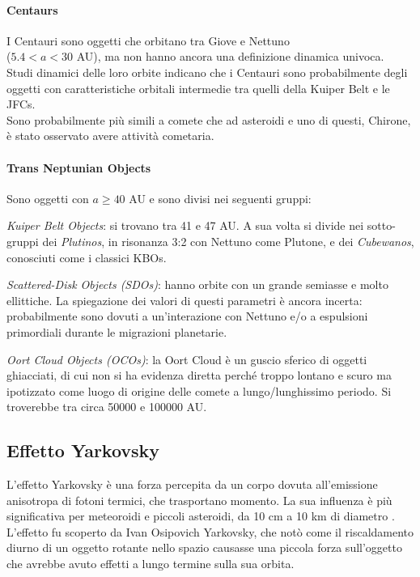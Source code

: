\documentclass[a4paper,11pt,openright]{book}
\begin{document}
\paragraph*{Centaurs}
I Centauri sono oggetti che orbitano tra Giove e Nettuno\\($5.4<a<30$ AU), ma non hanno ancora una definizione dinamica univoca.\\
Studi dinamici delle loro orbite indicano che i Centauri sono probabilmente degli oggetti con caratteristiche orbitali intermedie tra quelli della Kuiper Belt e le JFCs.\\
Sono probabilmente più simili a comete che ad asteroidi e uno di questi, Chirone, è stato osservato avere attività cometaria.

\paragraph*{Trans Neptunian Objects}
Sono oggetti con $a\geq 40$ AU e sono divisi nei seguenti gruppi:

\qquad \textit{Kuiper Belt Objects}: si trovano tra 41 e 47 AU. A sua volta si divide nei sotto-gruppi dei \textit{Plutinos}, in risonanza 3:2 con Nettuno come Plutone, e dei \textit{Cubewanos}, conosciuti come i classici KBOs.

\qquad \textit{Scattered-Disk Objects (SDOs)}: hanno orbite con un grande semiasse e molto ellittiche. La spiegazione dei valori di questi parametri è ancora incerta: probabilmente sono dovuti a un’interazione con Nettuno e/o a espulsioni primordiali durante le migrazioni planetarie.

\qquad \textit{Oort Cloud Objects (OCOs)}: la Oort Cloud è un guscio sferico di oggetti ghiacciati, di cui non si ha evidenza diretta perché troppo lontano e scuro ma ipotizzato come luogo di origine delle comete a lungo/lunghissimo periodo. Si troverebbe tra circa 50000 e 100000 AU.

\subsection{Effetto Yarkovsky}
L’effetto Yarkovsky è una forza percepita da un corpo dovuta all’emissione anisotropa di fotoni termici, che trasportano momento. La sua influenza è più significativa per meteoroidi e piccoli asteroidi, da 10 cm a 10 km di diametro \citep{vokrouhlicky_yarkovsky_2015}.\\
L’effetto fu scoperto da Ivan Osipovich Yarkovsky, che notò come il riscaldamento diurno di un oggetto rotante nello spazio causasse una piccola forza sull’oggetto che avrebbe avuto effetti a lungo termine sulla sua orbita.
\end{document}
